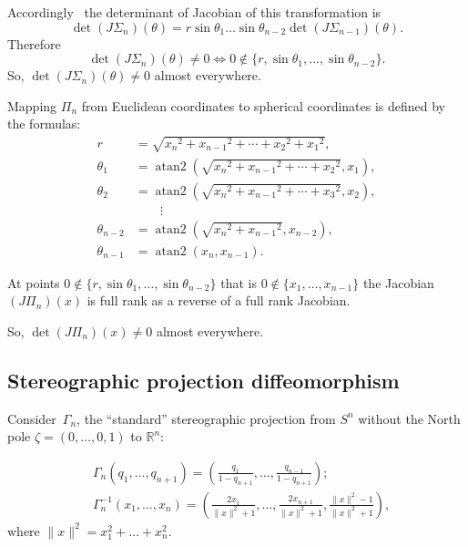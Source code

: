 \documentclass[oneside,draft]{amsart}
\begin{document}
Accordingly~\cite{polar-jacobian} the determinant of Jacobian of this transformation is
\[ \det (J\Sigma_n)(\theta) = r\sin\theta_1\dots\sin\theta_{n-2}\det (J\Sigma_{n-1})(\theta). \]
Therefore
\[
\det (J\Sigma_n)(\theta)\ne 0\Leftrightarrow 0\notin\{r,\sin\theta_1,\dots,\sin\theta_{n-2}\}.
\]
So, $\det (J\Sigma_n)(\theta)\ne 0$ almost everywhere.

Mapping $\Pi_n$ from Euclidean coordinates to spherical coordinates is defined by the formulas:
\[
\begin{aligned}r&={\textstyle {\sqrt {{x_{n}}^{2}+{x_{n-1}}^{2}+\cdots +{x_{2}}^{2}+{x_{1}}^{2}}}},\\\theta _{1}&=\operatorname {atan2} \left({\textstyle {\sqrt {{x_{n}}^{2}+{x_{n-1}}^{2}+\cdots +{x_{2}}^{2}}}},x_{1}\right),\\\theta _{2}&=\operatorname {atan2} \left({\textstyle {\sqrt {{x_{n}}^{2}+{x_{n-1}}^{2}+\cdots +{x_{3}}^{2}}}},x_{2}\right),\\&\qquad \vdots \\\theta _{n-2}&=\operatorname {atan2} \left({\textstyle {\sqrt {{x_{n}}^{2}+{x_{n-1}}^{2}}}},x_{n-2}\right),\\\theta _{n-1}&=\operatorname {atan2} \left(x_{n},x_{n-1}\right).\end{aligned}
\]  

At points $0\notin\{r,\sin\theta_1,\dots,\sin\theta_{n-2}\}$ that is $0\notin\{x_1,\dots,x_{n-1}\}$ the Jacobian $(J\Pi_n)(x)$
is full rank as a reverse of a full rank Jacobian.

So, $\det (J\Pi_n)(x)\ne 0$ almost everywhere.

\subsection{Stereographic projection diffeomorphism}

Consider~$\Gamma_n$, the ``standard'' stereographic projection from $S^n$ without the North pole $\zeta=(0,\dots,0,1)$ to $\mathbb{R}^n$: 

\begin{align*}
&\Gamma_n(q_1,\dots,q_{n+1}) = \left(\frac{q_1}{1-q_{n+1}},\dots,\frac{q_{n-1}}{1-q_{n+1}}\right);\\
&\Gamma_n^{-1}(x_1,\dots,x_n) = \left(\frac{2x_1}{\lVert x\rVert^2+1},\dots,\frac{2x_{n+1}}{\lVert x\rVert^2+1},\frac{\lVert x\rVert^2-1}{\lVert x\rVert^2+1}\right),
\end{align*}
where $\lVert x\rVert^2 = x_1^2+\dots+x_n^2$.
\end{document}
